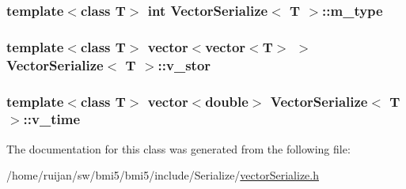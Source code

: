 \hypertarget{classVectorSerialize_ae3e04f4e93664fdefc8091048ec92153}{
\subsubsection[{m\-\_\-type}]{\setlength{\rightskip}{0pt plus 5cm}template$<$class T$>$ int {\bf Vector\-Serialize}$<$ T $>$\-::m\-\_\-type}}\label{classVectorSerialize_ae3e04f4e93664fdefc8091048ec92153}
\hypertarget{classVectorSerialize_aa092678fb5228aa59774c637755e65c4}{
\subsubsection[{v\-\_\-stor}]{\setlength{\rightskip}{0pt plus 5cm}template$<$class T$>$ vector$<$vector$<$T$>$ $>$ {\bf Vector\-Serialize}$<$ T $>$\-::v\-\_\-stor}}\label{classVectorSerialize_aa092678fb5228aa59774c637755e65c4}
\hypertarget{classVectorSerialize_a43ce9711f370fa70f243971d66e50d70}{
\subsubsection[{v\-\_\-time}]{\setlength{\rightskip}{0pt plus 5cm}template$<$class T$>$ vector$<$double$>$ {\bf Vector\-Serialize}$<$ T $>$\-::v\-\_\-time}}\label{classVectorSerialize_a43ce9711f370fa70f243971d66e50d70}


The documentation for this class was generated from the following file\-:\begin{DoxyCompactItemize}
\item 
/home/ruijan/sw/bmi5/bmi5/include/\-Serialize/\hyperlink{vectorSerialize_8h}{vector\-Serialize.\-h}\end{DoxyCompactItemize}
